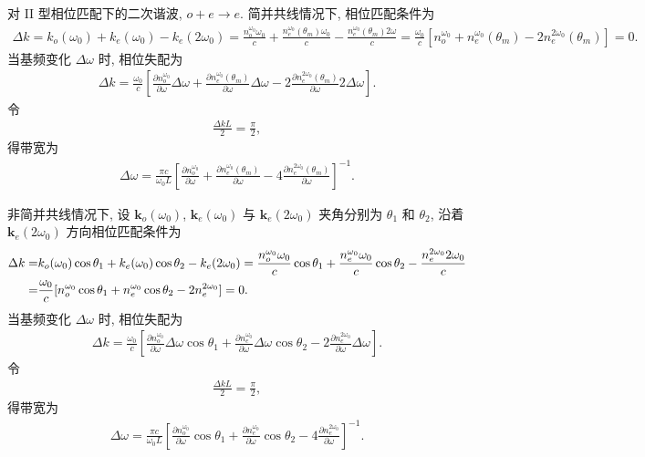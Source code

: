 \documentclass{assignment}
\begin{document}
\begin{pf}
    对 II 型相位匹配下的二次谐波, $o+e\rightarrow e$. 简并共线情况下, 相位匹配条件为
    \begin{align}
        \Delta k=k_o(\omega_0)+k_e(\omega_0)-k_e(2\omega_0)=\frac{n_o^{\omega_0}\omega_0}{c}+\frac{n_e^{\omega_0}(\theta_m)\omega_0}{c}-\frac{n_e^{\omega_0}(\theta_m)2\omega}{c}=\frac{\omega_0}{c}[n_o^{\omega_0}+n_e^{\omega_0}(\theta_m)-2n_e^{2\omega_0}(\theta_m)]=0.
    \end{align}
    当基频变化 $\Delta\omega$ 时, 相位失配为
    \begin{align}
        \Delta k=\frac{\omega_0}{c}\left[\frac{\partial n_o^{\omega_0}}{\partial\omega}\Delta\omega+\frac{\partial n_e^{\omega_0}(\theta_m)}{\partial\omega}\Delta\omega-2\frac{\partial n_e^{2\omega_0}(\theta_m)}{\partial\omega}2\Delta\omega\right].
    \end{align}
    令
    \begin{align}
        \frac{\Delta kL}{2}=\frac{\pi}{2},
    \end{align}
    得带宽为
    \begin{align}
        \Delta\omega=\frac{\pi c}{\omega_0L}\left[\frac{\partial n_o^{\omega_0}}{\partial\omega}+\frac{\partial n_e^{\omega_0}(\theta_m)}{\partial\omega}-4\frac{\partial n_e^{2\omega_0}(\theta_m)}{\partial\omega}\right]^{-1}.
    \end{align}

    非简并共线情况下, 设 $\bm{k}_o(\omega_0)$, $\bm{k}_e(\omega_0)$ 与 $\bm{k}_e(2\omega_0)$ 夹角分别为 $\theta_1$ 和 $\theta_2$, 沿着 $\bm{k}_e(2\omega_0)$ 方向相位匹配条件为
    \begin{align}
        \notag\Delta k=&k_o(\omega_0)\cos\theta_1+k_e(\omega_0)\cos\theta_2-k_e(2\omega_0)=\frac{n_o^{\omega_0}\omega_0}{c}\cos\theta_1+\frac{n_e^{\omega_0}\omega_0}{c}\cos\theta_2-\frac{n_e^{2\omega_0}2\omega_0}{c}\\
        =&\frac{\omega_0}{c}[n_o^{\omega_0}\cos\theta_1+n_e^{\omega_0}\cos\theta_2-2n_e^{2\omega_0}]=0.
    \end{align}
    当基频变化 $\Delta\omega$ 时, 相位失配为
    \begin{align}
        \Delta k=\frac{\omega_0}{c}\left[\frac{\partial n_o^{\omega_0}}{\partial\omega}\Delta\omega\cos\theta_1+\frac{\partial n_e^{\omega_0}}{\partial\omega}\Delta\omega\cos\theta_2-2\frac{\partial n_e^{2\omega_0}}{\partial\omega}\Delta\omega\right].
    \end{align}
    令
    \begin{align}
        \frac{\Delta kL}{2}=\frac{\pi}{2},
    \end{align}
    得带宽为
    \begin{align}
        \Delta\omega=\frac{\pi c}{\omega_0L}\left[\frac{\partial n_o^{\omega_0}}{\partial\omega}\cos\theta_1+\frac{\partial n_e^{\omega_0}}{\partial\omega}\cos\theta_2-4\frac{\partial n_e^{2\omega_0}}{\partial\omega}\right]^{-1}.
    \end{align}
\end{pf}
\end{document}
